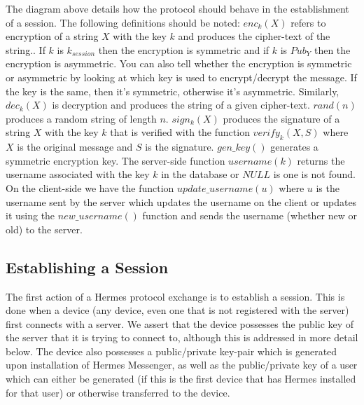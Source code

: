 \documentclass{article}
\begin{document}
The diagram above details how the protocol should behave in the establishment of a session. The following definitions should be noted: $enc_{k}(X)$ refers to encryption of a string $X$ with the key $k$ and produces the cipher-text of the string.. If $k$ is $k_{session}$ then the encryption is symmetric and if $k$ is $Pub_Y$ then the encryption is asymmetric. You can also tell whether the encryption is symmetric or asymmetric by looking at which key is used to encrypt/decrypt the message. If the key is the same, then it's symmetric, otherwise it's asymmetric. Similarly, $dec_k(X)$ is decryption and produces the string of a given cipher-text. $rand(n)$ produces a random string of length $n$. $sign_k(X)$ produces the signature of a string $X$ with the key $k$ that is verified with the function $verify_k(X,S)$ where $X$ is the original message and $S$ is the signature. $gen\_key()$ generates a symmetric encryption key. The server-side function $username(k)$ returns the username associated with the key $k$ in the database or $NULL$ is one is not found. On the client-side we have the function $update\_username(u)$ where $u$ is the username sent by the server which updates the username on the client or updates it using the $new\_username()$ function and sends the username (whether new or old) to the server.

\subsection{Establishing a Session}

The first action of a Hermes protocol exchange is to establish a session. This is done when a device (any device, even one that is not registered with the server) first connects with a server. We assert that the device possesses the public key of the server that it is trying to connect to, although this is addressed in more detail below. The device also possesses a public/private key-pair which is generated upon installation of Hermes Messenger, as well as the public/private key of a user which can either be generated (if this is the first device that has Hermes installed for that user) or otherwise transferred to the device.
\end{document}
